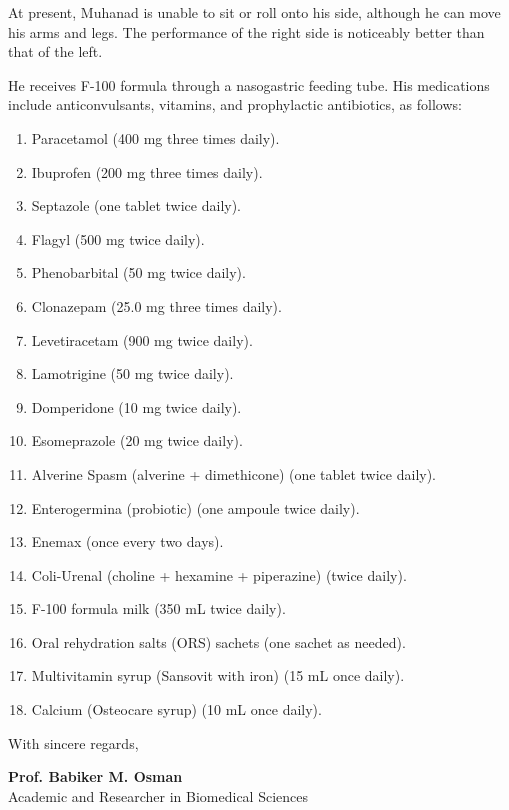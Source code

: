 \documentclass[12pt,a4paper]{article}
\begin{document}
At present, Muhanad is unable to sit or roll onto his side, although he can move his arms and legs. The performance of the right side is noticeably better than that of the left.

He receives F-100 formula through a nasogastric feeding tube. His medications include anticonvulsants, vitamins, and prophylactic antibiotics, as follows:

\begin{enumerate}[label=\arabic*. ,leftmargin=*,itemsep=3pt]
\item Paracetamol (400 mg three times daily).
\item Ibuprofen (200 mg three times daily).
\item Septazole (one tablet twice daily).
\item Flagyl (500 mg twice daily).
\item Phenobarbital (50 mg twice daily).
\item Clonazepam (25.0 mg three times daily).
\item Levetiracetam (900 mg twice daily).
\item Lamotrigine (50 mg twice daily).
\item Domperidone (10 mg twice daily).
\item Esomeprazole (20 mg twice daily).
\item Alverine Spasm (alverine + dimethicone) (one tablet twice daily).
\item Enterogermina (probiotic) (one ampoule twice daily).
\item Enemax (once every two days).
\item Coli-Urenal (choline + hexamine + piperazine) (twice daily).
\item F-100 formula milk (350 mL twice daily).
\item Oral rehydration salts (ORS) sachets (one sachet as needed).
\item Multivitamin syrup (Sansovit with iron) (15 mL once daily).
\item Calcium (Osteocare syrup) (10 mL once daily).
\end{enumerate}

\vspace{1em}
With sincere regards,

\textbf{Prof. Babiker M. Osman}\\
Academic and Researcher in Biomedical Sciences
\end{document}
